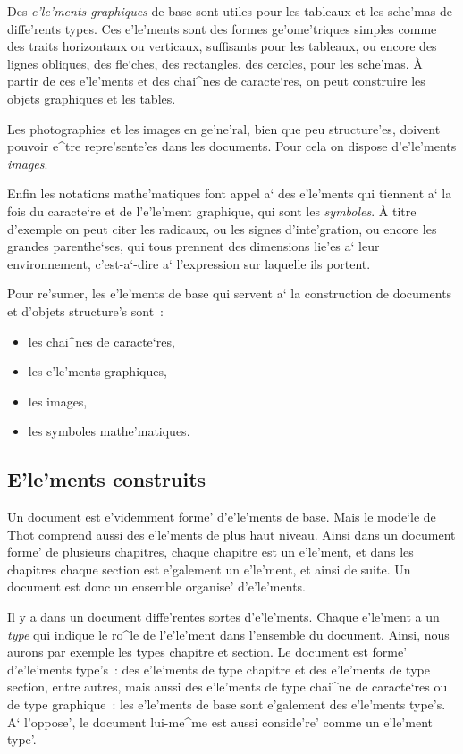 Des {\em e'le'ments graphiques} de base sont utiles pour les tableaux et les
sche'mas de diffe'rents types. Ces e'le'ments sont des formes ge'ome'triques
simples comme des traits horizontaux ou verticaux, suffisants pour les
tableaux, ou encore des lignes obliques, des fle`ches, des rectangles,
des cercles, pour les sche'mas. \`{A} partir de ces e'le'ments et des chai^nes
de caracte`res, on peut construire les objets graphiques et les tables.

Les photographies et les images en ge'ne'ral, bien que peu structure'es,
doivent pouvoir e^tre repre'sente'es dans les documents. Pour cela on
dispose d'e'le'ments {\em images}.

Enfin les notations mathe'matiques font appel a` des e'le'ments qui tiennent
a` la fois du caracte`re et de l'e'le'ment graphique, qui sont les
{\em symboles}. \`{A} titre d'exemple on peut citer les radicaux, ou les
signes d'inte'gration, ou encore les grandes parenthe`ses, qui tous prennent
des dimensions lie'es a` leur environnement, c'est-a`-dire a` l'expression sur
laquelle ils portent.

Pour re'sumer, les e'le'ments de base qui servent a` la construction de
documents et d'objets structure's sont~:

\begin{itemize}
\item
les chai^nes de caracte`res,
\item
les e'le'ments graphiques,
\item
les images,
\item
les symboles mathe'matiques.
\end{itemize}

\subsection{E'le'ments construits}

Un document est e'videmment forme' d'e'le'ments de base. Mais le mode`le de
Thot comprend aussi des e'le'ments de plus haut niveau. Ainsi dans un document
forme' de plusieurs chapitres, chaque chapitre est un e'le'ment, et dans les
chapitres chaque section est e'galement un e'le'ment, et ainsi de suite.
Un document est donc un ensemble organise' d'e'le'ments.

Il y a dans un document diffe'rentes sortes d'e'le'ments. Chaque e'le'ment
a un {\em type} qui indique le ro^le de l'e'le'ment dans l'ensemble du
document. Ainsi, nous aurons par exemple les types chapitre et section.
Le document est forme' d'e'le'ments type's~: des e'le'ments de type chapitre
et des e'le'ments de type section, entre autres, mais aussi des e'le'ments
de type chai^ne de caracte`res ou de type graphique~: les e'le'ments de base
sont e'galement des e'le'ments type's. A` l'oppose', le document lui-me^me
est aussi conside're' comme un e'le'ment type'.

